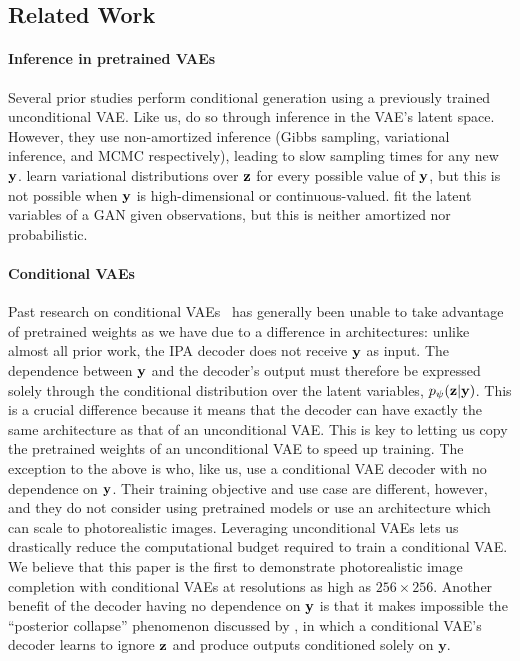 \subsection{Related Work}
\paragraph{Inference in pretrained VAEs}
Several prior studies perform conditional generation using a previously trained
unconditional VAE.
%
Like us, \citet{rezende2014stochastic,nguyen2016plug,wu2018conditional} do so
through inference in the VAE's latent space. However, they use non-amortized
inference (Gibbs sampling, variational inference, and MCMC respectively),
leading to slow sampling times for any new ${\mathbf{y}}$.
%
\citet{duan2019pre} learn variational distributions over ${\mathbf{z}}$ for every possible
value of ${\mathbf{y}}$, but this is not possible when ${\mathbf{y}}$ is
high-dimensional or continuous-valued.
%
\citet{yeh2017semantic} fit the latent variables of a GAN given observations,
but this is neither amortized nor probabilistic.
%

\paragraph{Conditional VAEs}
Past research on conditional
VAEs~\citep{sohn2015learning,zheng2019pluralistic,ivanov2018variational,wan2021high}
has generally been unable to take advantage of pretrained weights as we have due
to a difference in architectures: unlike almost all prior work, the IPA decoder
does not receive ${\mathbf{y}}$ as input. The dependence between ${\mathbf{y}}$ and the
decoder's output must therefore be expressed solely through the conditional
distribution over the latent variables, $p_\psi({\mathbf{z}}|{\mathbf{y}})$. This is a crucial
difference because it means that the decoder can have exactly the same
architecture as that of an unconditional VAE. This is key to letting us copy the
pretrained weights of an unconditional VAE to speed up training. The exception
to the above is \citet{ma2018eddi} who, like us, use a conditional VAE decoder
with no dependence on ${\mathbf{y}}$. Their training objective and use case are
different, however, and they do not consider using pretrained models or use an
architecture which can scale to photorealistic images. Leveraging unconditional
VAEs lets us drastically reduce the computational budget required to train a
conditional VAE. We believe that this paper is the first to demonstrate
photorealistic image completion with conditional VAEs at resolutions as high as
$256\times256$.
% 
Another benefit of the decoder having no dependence on ${\mathbf{y}}$ is that it
makes impossible the ``posterior collapse'' phenomenon discussed by
\citet{zheng2019pluralistic}, in which a conditional VAE's decoder learns to
ignore ${\mathbf{z}}$ and produce outputs conditioned solely on $\mathbf{y}$.


